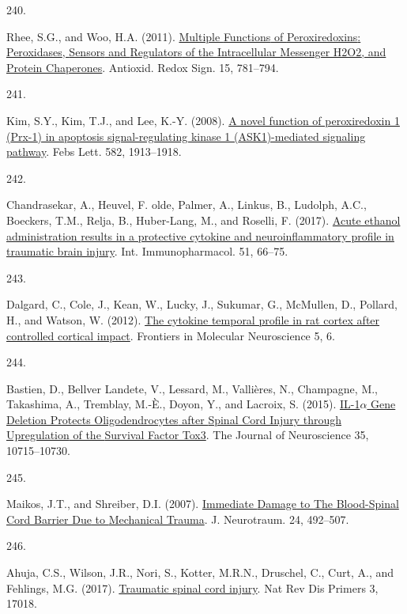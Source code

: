 \documentclass[
]{article}
\newlength{\cslhangindent}
\newlength{\csllabelwidth}
\newlength{\cslentryspacingunit} %
\newenvironment{CSLReferences}[2] %
 {%
  \setlength{\parindent}{0pt}
  \ifodd #1
  \let\oldpar\par
  \def\par{\hangindent=\cslhangindent\oldpar}
  \fi
  \setlength{\parskip}{#2\cslentryspacingunit}
 }%
 {}
\newcommand{\CSLLeftMargin}[1]{\parbox[t]{\csllabelwidth}{#1}}
\newcommand{\CSLRightInline}[1]{\parbox[t]{\linewidth - \csllabelwidth}{#1}\break}
\begin{document}
\begin{CSLReferences}{0}{0}
\leavevmode{}%
\CSLLeftMargin{240. }
\CSLRightInline{Rhee, S.G., and Woo, H.A. (2011). \href{https://doi.org/10.1089/ars.2010.3393}{Multiple {Functions} of {Peroxiredoxins}: {Peroxidases}, {Sensors} and {Regulators} of the {Intracellular Messenger H2O2}, and {Protein Chaperones}}. Antioxid. Redox Sign. 15, 781--794.}

\leavevmode{}%
\CSLLeftMargin{241. }
\CSLRightInline{Kim, S.Y., Kim, T.J., and Lee, K.-Y. (2008). \href{https://doi.org/10.1016/j.febslet.2008.05.015}{A novel function of peroxiredoxin 1 ({Prx-1}) in apoptosis signal-regulating kinase 1 ({ASK1})-mediated signaling pathway}. Febs Lett. 582, 1913--1918.}

\leavevmode{}%
\CSLLeftMargin{242. }
\CSLRightInline{Chandrasekar, A., Heuvel, F. olde, Palmer, A., Linkus, B., Ludolph, A.C., Boeckers, T.M., Relja, B., Huber-Lang, M., and Roselli, F. (2017). \href{https://doi.org/10.1016/j.intimp.2017.08.002}{Acute ethanol administration results in a protective cytokine and neuroinflammatory profile in traumatic brain injury}. Int. Immunopharmacol. 51, 66--75.}

\leavevmode{}%
\CSLLeftMargin{243. }
\CSLRightInline{Dalgard, C., Cole, J., Kean, W., Lucky, J., Sukumar, G., McMullen, D., Pollard, H., and Watson, W. (2012). \href{https://doi.org/10.3389/fnmol.2012.00006}{The cytokine temporal profile in rat cortex after controlled cortical impact}. Frontiers in Molecular Neuroscience 5, 6.}

\leavevmode{}%
\CSLLeftMargin{244. }
\CSLRightInline{Bastien, D., Bellver Landete, V., Lessard, M., Vallières, N., Champagne, M., Takashima, A., Tremblay, M.-È., Doyon, Y., and Lacroix, S. (2015). \href{https://doi.org/10.1523/JNEUROSCI.0498-15.2015}{{IL-1\(\alpha\) Gene Deletion Protects Oligodendrocytes} after {Spinal Cord Injury} through {Upregulation} of the {Survival Factor Tox3}}. The Journal of Neuroscience 35, 10715--10730.}

\leavevmode{}%
\CSLLeftMargin{245. }
\CSLRightInline{Maikos, J.T., and Shreiber, D.I. (2007). \href{https://doi.org/10.1089/neu.2006.0149}{Immediate {Damage} to {The Blood-Spinal Cord Barrier Due} to {Mechanical Trauma}}. J. Neurotraum. 24, 492--507.}

\leavevmode{}%
\CSLLeftMargin{246. }
\CSLRightInline{Ahuja, C.S., Wilson, J.R., Nori, S., Kotter, M.R.N., Druschel, C., Curt, A., and Fehlings, M.G. (2017). \href{https://doi.org/10.1038/nrdp.2017.18}{Traumatic spinal cord injury}. Nat Rev Dis Primers 3, 17018.}


\end{CSLReferences}
\end{document}
